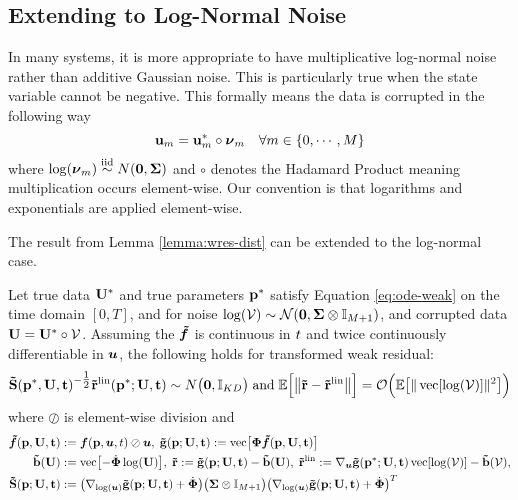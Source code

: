 \subsection{Extending to Log-Normal Noise} \label{sec:log}
In many systems, it is more appropriate to have multiplicative log-normal noise rather than additive Gaussian noise. This is particularly true when the state variable cannot be negative. This formally means the data is corrupted in the following way
\[\mathbf{u}_m = \mathbf{u}^*_m \circ \boldsymbol{\nu}_m \quad \forall m \in \{0, \cdots, M\} \]
where \(\log(\boldsymbol{\nu}_m) \stackrel{\text{iid}}{\sim} N({\mathbf{0}}, {\mathbf{\Sigma}})\) and $\circ$ denotes the Hadamard Product meaning multiplication occurs element-wise. Our convention is that logarithms and exponentials are applied element-wise.

The result from Lemma \ref{lemma:wres-dist} can be extended to the log-normal case. 
\begin{corollary} \label{cor:log-dist}
	Let true data $\mathbf{U}^*$ and true parameters $\mathbf{p}^*$ satisfy Equation \eqref{eq:ode-weak} on the time domain $[0,T]$, and for noise $\log(\mathbf{\mathcal{V}}) \sim \mathcal{N}(\mathbf{0},  \mathbf{\Sigma} \otimes \mathbb{I}_{M+1})$, and corrupted data $\mathbf{U} = \mathbf{U}^* \circ \mathbf{\mathcal{V}}$. Assuming the $\boldsymbol{\tilde{f}}$ is continuous in $t$ and twice continuously differentiable in $\boldsymbol{u}$, the following holds for transformed weak residual:
	\[\mathbf{\tilde{S}}(\mathbf{p}^*,\mathbf{U}, \mathbf{t})^{-\tfrac{1}{2}} \mathbf{\tilde{r}^{\mathrm{lin}}}(\mathbf{p}^*; \mathbf{U}, \mathbf{t}) \sim N\bigl({\mathbf{0}}, \mathbb{I}_{KD}\bigr) \; \mathrm{and} \; \mathbb{E}\Bigl[\bigl\|\mathbf{\tilde{r}} - \mathbf{\tilde{r}^{\mathrm{lin}}}\bigr\|\Bigr] = \mathcal{O}\Bigl(\mathbb{E}\bigl[\|\operatorname{vec}[\log(\mathbf{\mathcal{V}})]\|^2\bigr]\Bigr)\]
	where $\oslash$ is element-wise division and
	\[\begin{aligned}
		\boldsymbol{\tilde{f}}(\mathbf{p}, \mathbf{U}, \mathbf{t}) &:= \boldsymbol{f}(\mathbf{p}, \boldsymbol{u}, t) \oslash \boldsymbol{u}, \;
		\mathbf{\tilde{g}}(\mathbf{p};\mathbf{U},\mathbf{t}) := \operatorname{vec}\bigl[\boldsymbol{\Phi} \boldsymbol{\tilde{f}}(\mathbf{p}, \mathbf{U}, \mathbf{t})\bigr]\\
		\mathbf{\tilde{b}}(\mathbf{U}) &:= \operatorname{vec} \bigl[- \dot{\boldsymbol{\Phi}} \log(\mathbf{U})\bigr],\;
		\mathbf{\tilde{r}} := \mathbf{\tilde{g}}(\mathbf{p};\mathbf{U},\mathbf{t}) - \mathbf{\tilde{b}}(\mathbf{U}), \;
		\mathbf{\tilde{r}^{\mathrm{lin}}} := \nabla_{\boldsymbol{u}} \mathbf{\tilde{g}}(\mathbf{p}^*; \mathbf{U}, \mathbf{t})\operatorname{vec}[\log(\mathbf{\mathcal{V}})] - \mathbf{\tilde{b}}(\mathbf{\mathcal{V}}), \\
		\mathbf{\tilde{S}}(\mathbf{p};\mathbf{U},\mathbf{t}) &:= \bigl(\nabla_{\log(\boldsymbol{u})} \mathbf{\tilde{g}}(\mathbf{p};\mathbf{U},\mathbf{t}) + \dot{\boldsymbol{\Phi}}\bigr)\bigl( \mathbf{\Sigma} \otimes \mathbb{I}_{M+1}\bigr)\bigl(\nabla_{\log(\boldsymbol{u})}\mathbf{\tilde{g}}(\mathbf{p};\mathbf{U},\mathbf{t})+ \dot{\boldsymbol{\Phi}}\bigr)^T
	\end{aligned}\]
\end{corollary}

